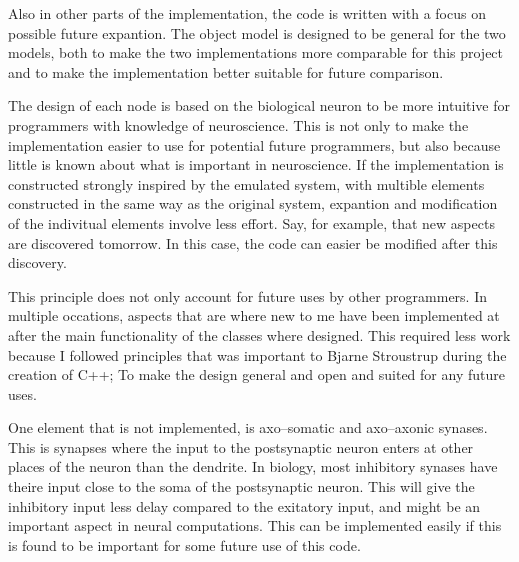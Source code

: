Also in other parts of the implementation, the code is written with a focus on possible future expantion.
The object model is designed to be general for the two models, both to make the two implementations more comparable for this project and to make the implementation better suitable for future comparison.

The design of each node is based on the biological neuron to be more intuitive for programmers with knowledge of neuroscience. 
This is not only to make the implementation easier to use for potential future programmers, but also because little is known about what is important in neuroscience.
If the implementation is constructed strongly inspired by the emulated system, with multible elements constructed in the same way as the original system, expantion and modification of the indivitual elements involve less effort.
Say, for example, that new aspects are discovered tomorrow. In this case, the code can easier be modified after this discovery.

This principle does not only account for future uses by other programmers.
In multiple occations, aspects that are where new to me have been implemented at after the main functionality of the classes where designed. 
This required less work because I followed principles that was important to Bjarne Stroustrup during the creation of C++; To make the design general and open and suited for any future uses.%

One element that is not implemented, is axo--somatic and axo--axonic synases. 
This is synapses where the input to the postsynaptic neuron enters at other places of the neuron than the dendrite. 
In biology, most inhibitory synases have theire input close to the soma of the postsynaptic neuron. 
This will give the inhibitory input less delay compared to the exitatory input, and might be an important aspect in neural computations.
This can be implemented easily if this is found to be important for some future use of this code.

